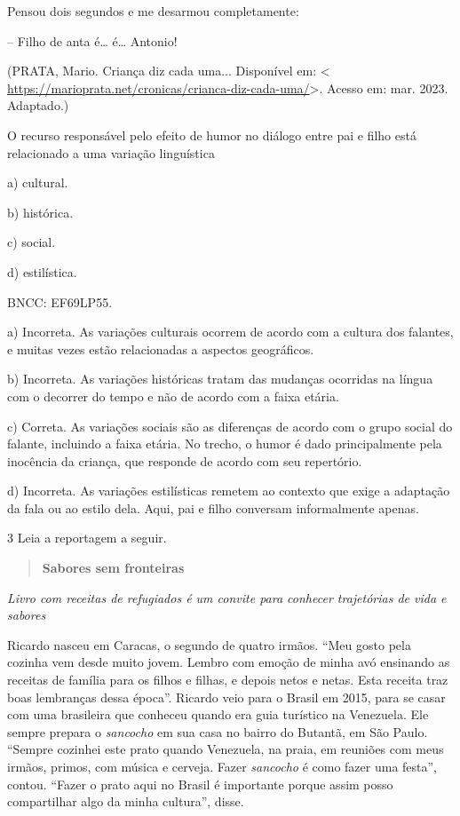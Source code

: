 {Pensou dois segundos e me desarmou completamente:

-- Filho de anta é\ldots{} é\ldots{} Antonio!

(PRATA, Mario. Criança diz cada uma... Disponível em: \textless{}
\url{https://marioprata.net/cronicas/crianca-diz-cada-uma/}\textgreater.
Acesso em: mar. 2023. Adaptado.)

O recurso responsável pelo efeito de humor no diálogo entre pai e filho
está relacionado a uma variação linguística

a) cultural.

b) histórica.

c) social.

d) estilística.

BNCC: EF69LP55.

a) Incorreta. As variações culturais ocorrem de acordo com a cultura dos
falantes, e muitas vezes estão relacionadas a aspectos geográficos.

b) Incorreta. As variações históricas tratam das mudanças ocorridas na
língua com o decorrer do tempo e não de acordo com a faixa etária.

c) Correta. As variações sociais são as diferenças de acordo com o grupo
social do falante, incluindo a faixa etária. No trecho, o humor é dado
principalmente pela inocência da criança, que responde de acordo com seu
repertório.

d) Incorreta. As variações estilísticas remetem ao contexto que exige a
adaptação da fala ou ao estilo dela. Aqui, pai e filho conversam
informalmente apenas.

\num{3} Leia a reportagem a seguir.

\begin{quote}
\textbf{Sabores sem fronteiras}
\end{quote}

\emph{Livro com receitas de refugiados é um convite para conhecer
trajetórias de vida e sabores}

Ricardo nasceu em Caracas, o segundo de quatro irmãos. ``Meu gosto pela
cozinha vem desde muito jovem. Lembro com emoção de minha avó ensinando
as receitas de família para os filhos e filhas, e depois netos e netas.
Esta receita traz boas lembranças dessa época''. Ricardo veio para o
Brasil em 2015, para se casar com uma brasileira que conheceu quando era
guia turístico na Venezuela. Ele sempre prepara o \emph{sancocho} em sua
casa no bairro do Butantã, em São Paulo. ``Sempre cozinhei este prato
quando Venezuela, na praia, em reuniões com meus irmãos, primos, com
música e cerveja. Fazer \emph{sancocho} é como fazer uma festa'',
contou. ``Fazer o prato aqui no Brasil é importante porque assim posso
compartilhar algo da minha cultura'', disse.

}
